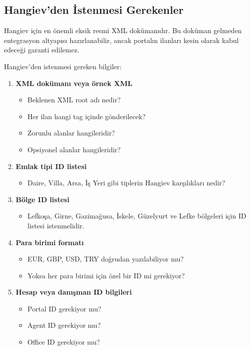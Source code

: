 \documentclass[11pt,a4paper]{article}
\begin{document}
\subsection{Hangiev'den İstenmesi Gerekenler}

Hangiev için en önemli eksik resmi XML dokümanıdır. Bu doküman gelmeden entegrasyon altyapısı hazırlanabilir, ancak portalın ilanları kesin olarak kabul edeceği garanti edilemez.

Hangiev'den istenmesi gereken bilgiler:

\begin{enumerate}
  \item \textbf{XML dokümanı veya örnek XML}
  \begin{itemize}
    \item Beklenen XML root adı nedir?
    \item Her ilan hangi tag içinde gönderilecek?
    \item Zorunlu alanlar hangileridir?
    \item Opsiyonel alanlar hangileridir?
  \end{itemize}

  \item \textbf{Emlak tipi ID listesi}
  \begin{itemize}
    \item Daire, Villa, Arsa, İş Yeri gibi tiplerin Hangiev karşılıkları nedir?
  \end{itemize}

  \item \textbf{Bölge ID listesi}
  \begin{itemize}
    \item Lefkoşa, Girne, Gazimağusa, İskele, Güzelyurt ve Lefke bölgeleri için ID listesi istenmelidir.
  \end{itemize}

  \item \textbf{Para birimi formatı}
  \begin{itemize}
    \item EUR, GBP, USD, TRY doğrudan yazılabiliyor mu?
    \item Yoksa her para birimi için özel bir ID mi gerekiyor?
  \end{itemize}

  \item \textbf{Hesap veya danışman ID bilgileri}
  \begin{itemize}
    \item Portal ID gerekiyor mu?
    \item Agent ID gerekiyor mu?
    \item Office ID gerekiyor mu?
  \end{itemize}


\end{enumerate}
\end{document}
